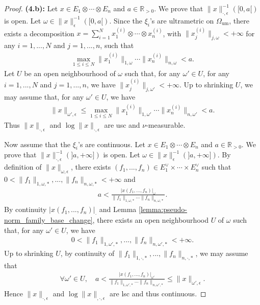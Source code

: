 \documentclass [11pt,reqno]{amsart}
\def\bR{{\mathbb{R}}}
\newcommand{\1}{\mathmybb{1}}
\def\um{\operatorname{um}}
\begin{document}
\begin{proof}
\textbf{(4.b):} Let $x\in E_1 \otimes\cdots\otimes E_n$ and $a\in \bR_{>0}$. We prove that $\|x\|_{\cdot,\epsilon}^{-1}([0,a[)$ is open. Let $\omega \in \|x\|_{\epsilon}^{-1}([0,a[)$. Since the $\xi_{i}$'s are ultrametric on $\Omega_{\um}$, there exists a decomposition $x=\sum_{i=1}^N x_1^{(i)}\otimes\cdots\otimes x_n^{(i)}$, with $\|x_j^{(i)}\|_{j,\omega}<+\infty$ for any $i=1,...,N$ and $j=1,...,n$, such that
\begin{align*}
\displaystyle\max_{1\leq i\leq N}\|x_1^{(i)}\|_{1,\omega}\cdots\|x_n^{(i)}\|_{n,\omega} < a.
\end{align*}
Let $U$ be an open neighbourhood of $\omega$ such that, for any $\omega'\in U$, for any $i=1,...,N$ and $j=1,...,n$, we have $\|x_j^{(i)}\|_{j,\omega'}<+\infty$. Up to shrinking $U$, we may assume that, for any $\omega'\in U$, we have
\begin{align*}
\|x\|_{\omega',\epsilon}\leq \displaystyle\max_{1\leq i\leq N}\|x_1^{(i)}\|_{1,\omega'}\cdots\|x_n^{(i)}\|_{n,\omega'} < a.
\end{align*}
Thus $\|x\|_{\cdot,\epsilon}$ and $\log\|x\|_{\cdot,\epsilon}$ are usc and $\nu$-measurable.

Now assume that the $\xi_{i}$'s are continuous. Let $x\in E_1 \otimes\cdots\otimes E_n$ and $a\in \bR_{>0}$. We prove that $\|x\|_{\cdot,\epsilon}^{-1}(]a,+\infty])$ is open. Let $\omega \in \|x\|_{\epsilon}^{-1}(]a,+\infty])$. By definition of $\|x\|_{\omega,\epsilon}$, there exists $(f_1,...,f_n)\in E_1^{\vee}\times\cdots\times E_n ^{\vee}$ such that $0<\|f_1\|_{1,\omega,\ast},...,\|f_n\|_{n,\omega,\ast}<+\infty$ and 
\begin{align*}
a< \frac{|x(f_1,...,f_n)|_{\omega}}{\|f_1\|_{1,\omega,\ast}\cdots\|f_n\|_{n,\omega,\ast}}.
\end{align*}
By continuity $|x(f_1,...,f_n)|_{\cdot}$ and Lemma \ref{lemma:pseudo-norm_family_base_change}, there exists an open neighbourhood $U$ of $\omega$ such that, for any $\omega'\in U$, we have
\begin{align*}
0 < \|f_1\|_{1,\omega',\ast},...,\|f_n\|_{n,\omega',\ast} < +\infty.
\end{align*}
Up to shrinking $U$, by continuity of  $\|f_1\|_{1,\cdot,\ast},...,\|f_n\|_{n,\cdot,\ast}$, we may assume that
\begin{align*}
\forall \omega'\in U, \quad a< \frac{|x(f_1,...,f_n)|_{\omega'}}{\|f_1\|_{1,\omega',\ast}\cdots\|f_n\|_{n,\omega',\ast}} \leq \|x\|_{\omega',\epsilon}.
\end{align*}
Hence $\|x\|_{\cdot,\epsilon}$ and $\log\|x\|_{,\cdot,\epsilon}$ are lsc and thus continuous.


\end{proof}
\end{document}
